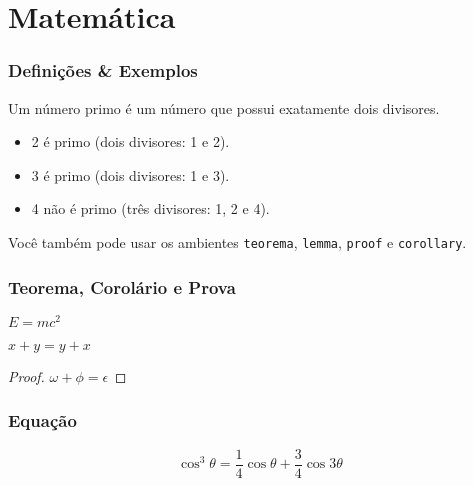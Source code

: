 
\section{Matemática}

\begin{frame}
	\frametitle{Definições \& Exemplos}
	
	\begin{definition}
		Um \alert{número primo} é um número que possui exatamente dois divisores.
	\end{definition}
	
	\smallskip 
	
	\begin{example}
		\begin{itemize}
			\item 2 é primo (dois divisores: 1 e 2).
			\item 3 é primo (dois divisores: 1 e 3).
			\item 4 não é primo (\alert{três} divisores: 1, 2 e 4).
		\end{itemize}
	\end{example}
	
	\smallskip 
	
	Você também pode usar os ambientes \texttt{teorema}, \texttt{lemma}, \texttt{proof} e \texttt{corollary}.
\end{frame}


\begin{frame}
	\frametitle{Teorema, Corolário e Prova}
	
	\begin{theorem}
		$E = mc^2$
	\end{theorem}
	
	\begin{corollary}
		$x + y = y + x$
	\end{corollary}
	
	\begin{proof}
		$\omega + \phi = \epsilon$
	\end{proof}
\end{frame}


\begin{frame}
	\frametitle{Equação}

	\begin{equation}
		\cos^3 \theta =\frac{1}{4}\cos\theta+\frac{3}{4}\cos 3\theta
	\end{equation}
\end{frame}

